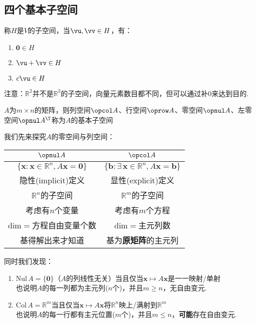 \subsection{四个基本子空间}
\begin{definition}[子空间]
称$H$是$V$的子空间，当$\vu,\vv\in H$，有：
\begin{enumerate}
	\item $\mathbf{0}\in H$
	\item $\vu+\vv\in H$
	\item $c\vu\in H$
\end{enumerate}
注意：$\mathbb{R}^2$并不是$\mathbb{R}^3$的子空间，向量元素数目都不同，但可以通过补$0$来达到目的.
\end{definition}
\begin{definition}[基本子空间]
$A$为$m\times n$的矩阵，则列空间$\opcol A$、行空间$\oprow A$、零空间$\opnul A$、左零空间$\opnul A^\T$称为$A$的基本子空间
\end{definition}
\label{nul_and_col}
我们先来探究$A$的零空间与列空间：
\renewcommand\arraystretch{1.2}
\begin{table}[!htbp]%
\begin{center}
\begin{tabular}{|c|c|}
\hline
$\opnul A$ & $\opcol A$ \\ \hline
$\{\mathbf{x}:\mathbf{x}\in\mathbb{R}^n,A\mathbf{x}=\mathbf{0}\}$ & $\{\mathbf{b}:\exists\,\mathbf{x}\in\mathbb{R}^n,A\mathbf{x}=\mathbf{b}\}$\\ \hline
隐性(implicit)定义 & 显性(explicit)定义 \\ \hline
$\mathbb{R}^n$的子空间 & $\mathbb{R}^m$的子空间\\ \hline
考虑有$n$个变量 & 考虑有$m$个方程\\ \hline
$\mathrm{dim}=$方程自由变量个数 & $\mathrm{dim}=$主元列数 \\ \hline
基得解出来才知道 & 基为\textbf{原矩阵}的主元列\\
\hline
\end{tabular}
\end{center}
\end{table}
\renewcommand\arraystretch{1}
\par 同时我们发现：
\begin{enumerate}
	\item $\mathrm{Nul}\, A=\{\mathbf{0}\}$（$A$的列线性无关）当且仅当$\mathbf{x}\mapsto A\mathbf{x}$是一一映射/单射\\
		也说明$A$的每一列都为主元列($n$个)，并且$m\geq n$，无自由变元.
	\item $\mathrm{Col}\, A=\mathbb{R}^m$当且仅当$\mathbf{x}\mapsto A\mathbf{x}$将$\mathbb{R}^n$映上/满射到$\mathbb{R}^m$\\
		也说明$A$的每一行都有主元位置($m$个)，并且$m\leq n$，\textbf{可能}存在自由变元.
\end{enumerate}
